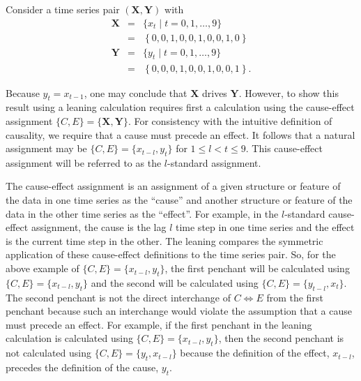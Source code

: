 \documentclass{article}[10pt]
\begin{document}
Consider a time series pair $(\mathbf{X},\mathbf{Y})$ with
\begin{eqnarray*}
\mathbf{X} &=& \{x_t\; | \; t=0,1,\ldots,9\}\\
&=& \left\{0,0,1,0,0,1,0,0,1,0\right\}\\
\mathbf{Y} &=& \{y_t\; | \; t=0,1,\ldots,9\}\\
&=& \left\{0,0,0,1,0,0,1,0,0,1\right\}.
\end{eqnarray*}

Because $y_t=x_{t-1}$, one may conclude that $\mathbf{X}$ drives $\mathbf{Y}$.  However, to show this result using a leaning calculation requires first a calculation using the cause-effect assignment $\{C,E\}=\{\mathbf{X},\mathbf{Y}\}$. For consistency with the intuitive definition of causality, we require that a cause must precede an effect.  It follows that a natural assignment may be $\{C,E\}=\{x_{t-l},y_t\}$ for $1 \leq l < t \leq 9$.  This cause-effect assignment will be referred to as the $l$-standard assignment.

The cause-effect assignment is an assignment of a given structure or feature of the data in one time series as the ``cause'' and another structure or feature of the data in the other time series as the ``effect''.  For example, in the $l$-standard cause-effect assignment, the cause is the lag $l$ time step in one time series and the effect is the current time step in the other.  The leaning compares the symmetric application of these cause-effect definitions to the time series pair.  So, for the above example of $\{C,E\}=\{x_{t-l},y_t\}$, the first penchant will be calculated using $\{C,E\}=\{x_{t-l},y_t\}$ and the second will be calculated using $\{C,E\}=\{y_{t-l},x_t\}$.  The second penchant is not the direct interchange of $C\Leftrightarrow E$ from the first penchant because such an interchange would violate the assumption that a cause must precede an effect.  For example, if the first penchant in the leaning calculation is calculated using $\{C,E\}=\{x_{t-l},y_t\}$, then the second penchant is not calculated using $\{C,E\}=\{y_t,x_{t-l}\}$ because the definition of the effect, $x_{t-l}$, precedes the definition of the cause, $y_t$.
\end{document}
